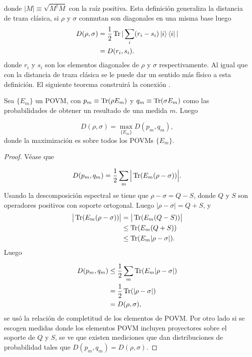 donde $|M| \equiv \sqrt{M^{\dagger}M}$ con la raíz positiva. Esta definición generaliza la distancia de traza clásica, si $\rho$ y $\sigma$ conmutan son diagonales en una misma base luego
\begin{align*}
D(\rho,\sigma) &= \frac{1}{2} \Tr |\sum_{i} (r_{i}-s_{i})\ket{i}\bra{i}|\\
\quad &= D(r_{i},s_{i}).
\end{align*}
donde $r_{i}$ y $s_{i}$ son los elementos diagonales de $\rho$ y $\sigma$ respectivamente. Al igual que con la distancia de traza clásica se le puede dar un sentido más físico a esta definición. El siguiente teorema construirá la conexión \cite{NielsenInformation}.
\begin{theorem}
Sea $\{ E_{m}\}$ un POVM, con  $p_{m} \equiv \Tr(\rho E_{m})$  y  $q_{m}\equiv \Tr(\sigma E_{m})$ como las probabilidades de obtener un resultado de una medida $m$. Luego

\begin{equation}
D(\rho,\sigma)= \max_{ \{ E_{m}\} } D(p_{m},q_{m}),
\end{equation}
donde la maximización es sobre todos los POVMs $\{ E_{m}\}$.
\end{theorem}

\begin{proof}

Véase que 

\begin{equation}
D(p_{m},q_{m})= \frac{1}{2} \sum_{m} \Big|\Tr(E_{m}(\rho- \sigma)) \Big|.
\end{equation}
Usando la descomposición espectral se tiene que $\rho- \sigma=Q-S$, donde $Q$ y $S$ son operadores positivos con soporte ortogonal. Luego $|\rho - \sigma|= Q+S$, y
\begin{align}
\big|\Tr(E_{m}(\rho- \sigma)) \big| &= \big|\Tr(E_{m}(Q-S)) \big| \\
\quad &\leq \Tr(E_{m}(Q+S))\\
\quad &\leq \Tr(E_{m}|\rho -\sigma|).
\end{align}
Luego 

\begin{align}
D(p_{m},q_{m}) &\leq \frac{1}{2} \sum_{m} \Tr(E_{m}|\rho-\sigma|)\\
\quad &= \frac{1}{2} \Tr(|\rho -\sigma|)\\
\quad &= D(\rho,\sigma),
\end{align}
se usó la relación de completitud de los elementos de POVM. Por otro lado si se escogen medidas donde los elementos POVM incluyen proyectores sobre el soporte de $Q$ y $S$, se ve que existen mediciones que dan distribuciones de probabilidad tales que $D(p_{m},q_{m})= D(\rho,\sigma)$.

\end{proof}

